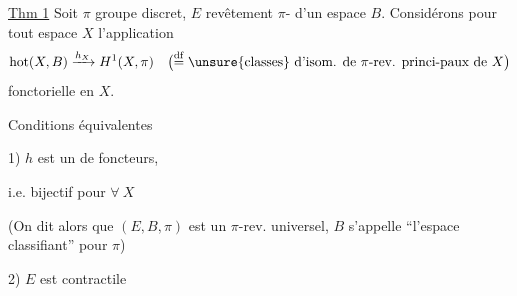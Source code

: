 \uline{Thm 1} Soit $\pi$ groupe discret, $E$ revêtement $\pi$- d'un espace $B$.
Considérons pour tout espace $X$ l'application
\[
\operatorname{hot}(X,B)\xrightarrow{h_X}H^1(X,\pi)
\quad\bigl(\overset{\mathrm{df}}=\text{\unsure{classes} d'isom. de $\pi$-rev. princi-paux de $X$}\bigr)
\]
fonctorielle en $X$.

Conditions équivalentes

1) $h$ est un  de foncteurs,

\hspace*{2em}i.e. bijectif pour $\forall\ X$

(On dit alors que $(E,B,\pi)$ est un $\pi$-rev. universel, $B$ s'appelle ``l'espace classifiant'' pour $\pi$)

2) $E$ est contractile

